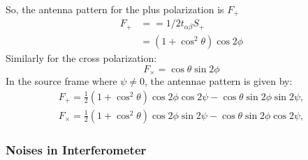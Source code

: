 \documentclass{ttuthes2007}
\begin{document}
So, the antenna pattern for the plus polarization is $F_+$
\begin{equation}
\begin{split}
F_+ & ==1/2t_{\alpha\beta}S_+\\
& = (1+\cos^2\theta)\cos2\phi
\end{split}
\end{equation}
Similarly for the cross polarization:
\begin{equation}
F_\times=\cos\theta\sin2\phi
\end{equation}
In the source frame where $\psi\neq0$, the antennae pattern is given by:
\begin{align}
F_+=\frac{1}{2}(1+\cos^2\theta)\cos2\phi\cos2\psi-\cos\theta\sin2\phi\sin2\psi,\\
F_\times=\frac{1}{2}(1+\cos^2\theta)\cos2\phi\sin2\psi-\cos\theta\sin2\phi\cos2\psi,
\end{align}

\subsubsection{Noises in Interferometer}
\end{document}
